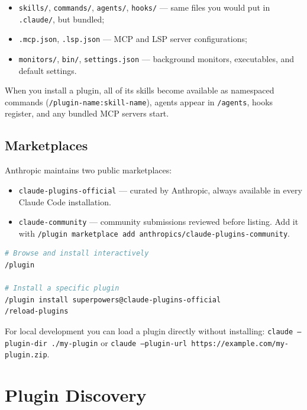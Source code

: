 \begin{itemize}
  \item \texttt{skills/}, \texttt{commands/}, \texttt{agents/},
        \texttt{hooks/} — same files you would put in
        \texttt{.claude/}, but bundled;
  \item \texttt{.mcp.json}, \texttt{.lsp.json} — MCP and LSP server
        configurations;
  \item \texttt{monitors/}, \texttt{bin/}, \texttt{settings.json} —
        background monitors, executables, and default settings.
\end{itemize}

When you install a plugin, all of its skills become available as
namespaced commands (\texttt{/plugin-name:skill-name}), agents appear in
\texttt{/agents}, hooks register, and any bundled MCP servers start.

\subsection{Marketplaces}

Anthropic maintains two public marketplaces:

\begin{itemize}
  \item \texttt{claude-plugins-official} — curated by Anthropic, always
        available in every Claude Code installation.
  \item \texttt{claude-community} — community submissions reviewed before
        listing. Add it with
        \texttt{/plugin marketplace add anthropics/claude-plugins-community}.
\end{itemize}

\begin{lstlisting}[language=bash,caption={Installing a plugin from the official marketplace}]
# Browse and install interactively
/plugin

# Install a specific plugin
/plugin install superpowers@claude-plugins-official
/reload-plugins
\end{lstlisting}

For local development you can load a plugin directly without installing:
\texttt{claude --plugin-dir ./my-plugin} or
\texttt{claude --plugin-url https://example.com/my-plugin.zip}.

\section{Plugin Discovery}
\label{sec:plugin-discovery}

